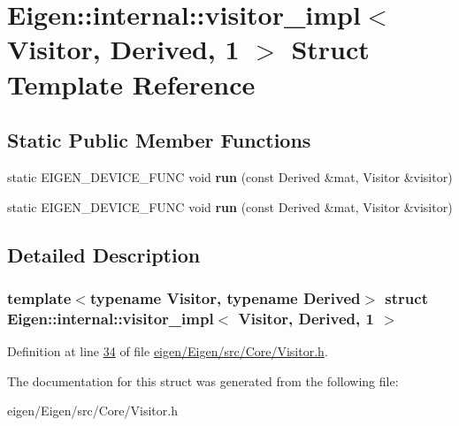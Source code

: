 \hypertarget{struct_eigen_1_1internal_1_1visitor__impl_3_01_visitor_00_01_derived_00_011_01_4}{}\section{Eigen\+:\+:internal\+:\+:visitor\+\_\+impl$<$ Visitor, Derived, 1 $>$ Struct Template Reference}
\label{struct_eigen_1_1internal_1_1visitor__impl_3_01_visitor_00_01_derived_00_011_01_4}
\subsection*{Static Public Member Functions}
\begin{DoxyCompactItemize}
\item 
\mbox{\label{struct_eigen_1_1internal_1_1visitor__impl_3_01_visitor_00_01_derived_00_011_01_4_a86fcc0efcda9aae71c9337f6a8b3d5ae}} 
static E\+I\+G\+E\+N\+\_\+\+D\+E\+V\+I\+C\+E\+\_\+\+F\+U\+NC void {\bfseries run} (const Derived \&mat, Visitor \&visitor)
\item 
\mbox{\label{struct_eigen_1_1internal_1_1visitor__impl_3_01_visitor_00_01_derived_00_011_01_4_a86fcc0efcda9aae71c9337f6a8b3d5ae}} 
static E\+I\+G\+E\+N\+\_\+\+D\+E\+V\+I\+C\+E\+\_\+\+F\+U\+NC void {\bfseries run} (const Derived \&mat, Visitor \&visitor)
\end{DoxyCompactItemize}


\subsection{Detailed Description}
\subsubsection*{template$<$typename Visitor, typename Derived$>$\newline
struct Eigen\+::internal\+::visitor\+\_\+impl$<$ Visitor, Derived, 1 $>$}



Definition at line \hyperlink{eigen_2_eigen_2src_2_core_2_visitor_8h_source_l00034}{34} of file \hyperlink{eigen_2_eigen_2src_2_core_2_visitor_8h_source}{eigen/\+Eigen/src/\+Core/\+Visitor.\+h}.



The documentation for this struct was generated from the following file\+:\begin{DoxyCompactItemize}
\item 
eigen/\+Eigen/src/\+Core/\+Visitor.\+h\end{DoxyCompactItemize}
